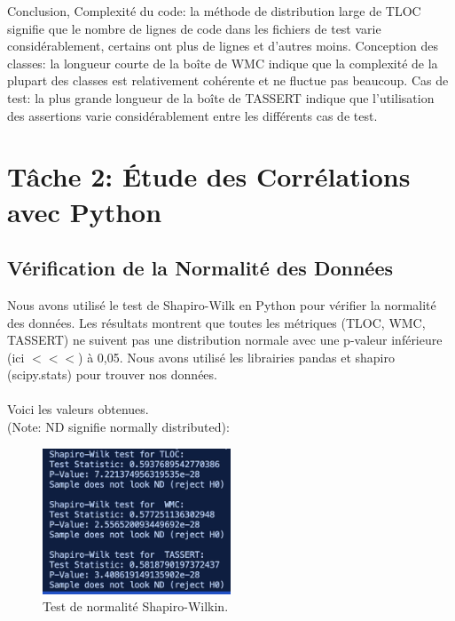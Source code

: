 \documentclass{proc}
\begin{document}
\begin{itemize}
Conclusion,
Complexité du code: la méthode de distribution large de TLOC signifie que le nombre de lignes de code dans les fichiers de test varie considérablement, certains ont plus de lignes et d'autres moins.
Conception des classes: la longueur courte de la boîte de WMC indique que la complexité de la plupart des classes est relativement cohérente et ne fluctue pas beaucoup.
Cas de test: la plus grande longueur de la boîte de TASSERT indique que l'utilisation des assertions varie considérablement entre les différents cas de test.


\section{Tâche 2: Étude des Corrélations avec Python}
\subsection{Vérification de la Normalité des Données}
Nous avons utilisé le test de Shapiro-Wilk \cite{SHAPIRO1965} en Python pour vérifier la normalité des données. Les résultats montrent que toutes les métriques (TLOC, WMC, TASSERT) ne suivent pas une distribution normale avec une p-valeur inférieure (ici $<<<$) à 0,05. Nous avons utilisé les librairies pandas \cite{reback2020pandas} et shapiro (scipy.stats) \cite{2020SciPy-NMeth} pour trouver nos données.
\\\\
Voici les valeurs obtenues. \\(Note: ND signifie normally distributed):

\begin{figure}[H]
    \centering
    \includegraphics[width=0.5\textwidth]{images/shapiro-wilk.png}
    \caption{Test de normalité Shapiro-Wilkin.}
    \label{fig:Test de normalité Shapiro-Wilkin}
\end{figure}



\end{itemize}
\end{document}
